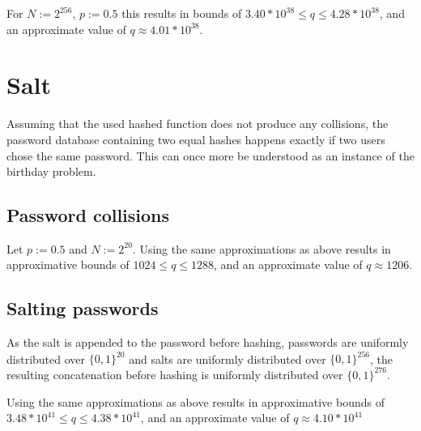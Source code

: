 \documentclass[a4paper]{scrreprt}
\begin{document}
For $N := 2^{256}$, $p := 0.5$ this results in bounds of $3.40 * 10^{38} \leq q
\leq 4.28 * 10^{38}$, and an approximate value of $q \approx 4.01 * 10^{38}$.


\section{Salt}

Assuming that the used hashed function does not produce any collisions, the
password database containing two equal hashes happens exactly if two users
chose the same password. This can once more be understood as an instance of the
birthday problem.

\subsection{Password collisions}

Let $p := 0.5$ and $N := 2^{20}$. Using the same approximations as above
results in approximative bounds of $1024 \leq q \leq 1288$, and an approximate
value of $q \approx 1206$.

\subsection{Salting passwords}

As the salt is appended to the password before hashing, passwords are uniformly
distributed over $\{0, 1\}^{20}$ and salts are uniformly distributed over $\{0,
1\}^{256}$, the resulting concatenation before hashing is uniformly distributed
over $\{0, 1\}^{276}$.

Using the same approximations as above results in approximative bounds of $3.48
* 10^{41} \leq q \leq 4.38 * 10^{41}$, and an approximate value of $q \approx
4.10 * 10^{41}$
\end{document}
